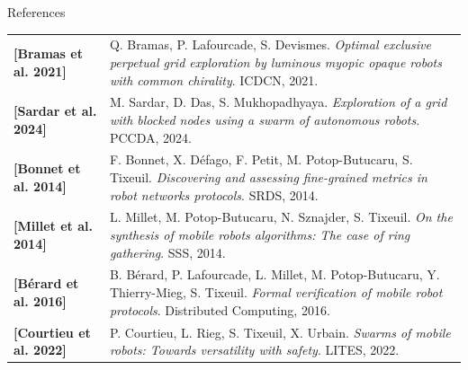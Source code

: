 \begin{frame}{References}
\begin{center}
  \vspace{-0.2cm}
  {\footnotesize
  \begin{tabular}{@{}p{}p{}@{}}
    \textbf{[Bramas et al. 2021]} & Q. Bramas, P. Lafourcade, S. Devismes. \textit{Optimal exclusive perpetual grid exploration by luminous myopic opaque robots with common chirality}. ICDCN, 2021. \\
    \textbf{[Sardar et al. 2024]} & M. Sardar, D. Das, S. Mukhopadhyaya. \textit{Exploration of a grid with blocked nodes using a swarm of autonomous robots}. PCCDA, 2024. \\
    \textbf{[Bonnet et al. 2014]} & F. Bonnet, X. Défago, F. Petit, M. Potop-Butucaru, S. Tixeuil. \textit{Discovering and assessing fine-grained metrics in robot networks protocols}. SRDS, 2014. \\
    \textbf{[Millet et al. 2014]} & L. Millet, M. Potop-Butucaru, N. Sznajder, S. Tixeuil. \textit{On the synthesis of mobile robots algorithms: The case of ring gathering}. SSS, 2014. \\
    \textbf{[Bérard et al. 2016]} & B. Bérard, P. Lafourcade, L. Millet, M. Potop-Butucaru, Y. Thierry-Mieg, S. Tixeuil. \textit{Formal verification of mobile robot protocols}. Distributed Computing, 2016. \\
    \textbf{[Courtieu et al. 2022]} & P. Courtieu, L. Rieg, S. Tixeuil, X. Urbain. \textit{Swarms of mobile robots: Towards versatility with safety}. LITES, 2022.
  \end{tabular}
  }
\end{center}
\end{frame}
